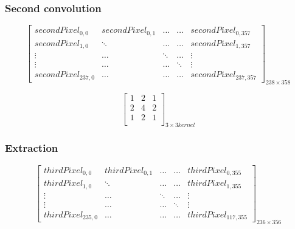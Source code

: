 \subsubsection{Second convolution}

\noindent\begin{minipage}{.3\textwidth}
\[
\begin{bmatrix}

secondPixel_{0,0} & secondPixel_{0,1} & \ldots & \ldots & secondPixel_{0,357}\\

secondPixel_{1,0} & \ddots & \ldots & \ldots & secondPixel_{1,357}\\

\vdots & \ldots & \ddots & \ldots & \vdots\\

\vdots & \ldots & \ldots & \ddots & \vdots\\

secondPixel_{237,0} & \ldots & \ldots  & \ldots & secondPixel_{237,357}

\end{bmatrix}_{238\times 358}
\]
\end{minipage}\hfill
\begin{minipage}{.3\textwidth}
\[
\begin{bmatrix}

1 & 2 & 1\\

2 & 4 & 2\\

1 & 2 & 1\\

\end{bmatrix}_{3\times 3 kernel}
\]
\end{minipage}


\subsubsection{Extraction}

\[
\begin{bmatrix}

thirdPixel_{0,0} & thirdPixel_{0,1} & \ldots & \ldots & thirdPixel_{0,355}\\

thirdPixel_{1,0} & \ddots & \ldots & \ldots & thirdPixel_{1,355}\\

\vdots & \ldots & \ddots & \ldots & \vdots\\

\vdots & \ldots & \ldots & \ddots & \vdots\\

thirdPixel_{235,0} & \ldots & \ldots  & \ldots & thirdPixel_{117,355}

\end{bmatrix}_{236\times 356}
\]



